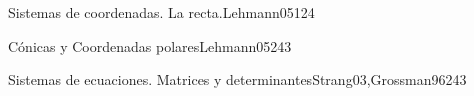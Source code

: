 \begin{syllabus}


\begin{justification}

\end{justification}

\begin{goals}
\item 
\item 
\end{goals}

\begin{outcomes}
    \item {}
    \item {}
\end{outcomes}

\begin{competences}
    \item {}
\end{competences}

\begin{unit}{Sistemas de coordenadas. La recta.}{Lehmann05}{12}{4}
   \begin{topics}
      \item 
      \item 
   \end{topics}
   \begin{learningoutcomes}
      \item 
   \end{learningoutcomes}
\end{unit}

\begin{unit}{Cónicas y Coordenadas polares}{Lehmann05}{24}{3}
   \begin{topics}
      \item 
      \item 
   \end{topics}

   \begin{learningoutcomes}
      \item 
      \item
      \item 
      \end{learningoutcomes}
\end{unit}

\begin{unit}{Sistemas de ecuaciones. Matrices y determinantes}{Strang03,Grossman96}{24}{3}
   \begin{topics}
      \item 
      \item 
      \item 
      \end{topics}


\end{unit}
\end{syllabus}
